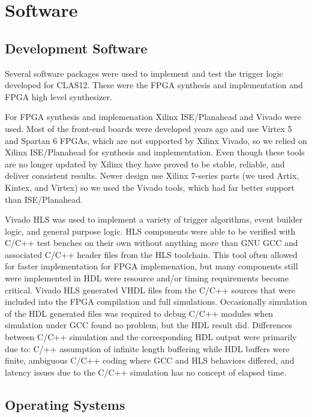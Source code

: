 \section{Software}



\subsection{Development Software}

Several software packages were used to implement and test the trigger logic developed for CLAS12. These were the FPGA synthesis and implementation and FPGA high level synthesizer.

For FPGA synthesis and implemenation Xilinx ISE/Planahead and Vivado were used. Most of the front-end boards were developed years ago and use Virtex 5 and Spartan 6 FPGAs, which are not supported by Xilinx Vivado, so we relied on Xilinx ISE/Planahead for synthesis and implementation. Even though these tools are no longer updated by Xilinx they have proved to be stable, reliable, and deliver consistent results. Newer design use Xilinx 7-series parts (we used Artix, Kintex, and Virtex) so we used the Vivado tools, which had far better support than ISE/Planahead.

Vivado HLS was used to implement a variety of trigger algorithms, event builder logic, and general purpose logic. HLS components were able to be verified with C/C++ test benches on their own without anything more than GNU GCC and associated C/C++ header files from the HLS toolchain. This tool often allowed for faster implementation for FPGA implemenation, but many components still were implemented in HDL were resource and/or timing requirements become critical. Vivado HLS generated VHDL files from the C/C++ sources that were included into the FPGA compilation and full simulations. Occasionally simulation of the HDL generated files was required to debug C/C++ modules when simulation under GCC found no problem, but the HDL result did. Differences between C/C++ simulation and the corresponding HDL output were primarily due to: C/++ assumption of infinite length buffering while HDL buffers were finite, ambiguous C/C++ coding where GCC and HLS behaviors differed, and latency issues due to the C/C++ simulation has no concept of elapsed time.

\subsection{Operating Systems}

